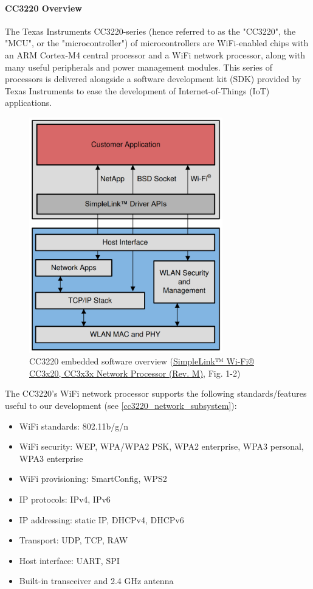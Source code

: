 \paragraph{CC3220 Overview}
The Texas Instruments CC3220-series (hence referred to as the "CC3220", the
"MCU", or the "microcontroller") of microcontrollers are WiFi-enabled
chips with an ARM Cortex-M4 central processor and a WiFi network processor,
along with many useful peripherals and power management modules. This
series of processors is delivered alongside a software development kit
(SDK) provided by Texas Instruments to ease the development of
Internet-of-Things (IoT) applications.
\begin{figure}[H]
    \caption{CC3220 embedded software overview (\href{https://www.ti.com/lit/ds/symlink/cc3220s.pdf}{SimpleLink™ Wi-Fi® CC3x20, CC3x3x Network Processor (Rev. M)}, Fig. 1-2)}
    \label{cc3220_sw_overview}
    \centering
    \includegraphics[width=0.75\textwidth]{images/cc3220_sw_overview.png}
\end{figure}
The CC3220's WiFi network processor supports the following
standards/features useful to our development
(see \autoref{cc3220_network_subsystem}):
\begin{itemize}
    \item WiFi standards: 802.11b/g/n
    \item WiFi security: WEP, WPA/WPA2 PSK, WPA2 enterprise, WPA3 personal,
    WPA3 enterprise
    \item WiFi provisioning: SmartConfig, WPS2
    \item IP protocols: IPv4, IPv6
    \item IP addressing: static IP, DHCPv4, DHCPv6
    \item Transport: UDP, TCP, RAW
    \item Host interface: UART, SPI
    \item Built-in transceiver and 2.4 GHz antenna
\end{itemize}
